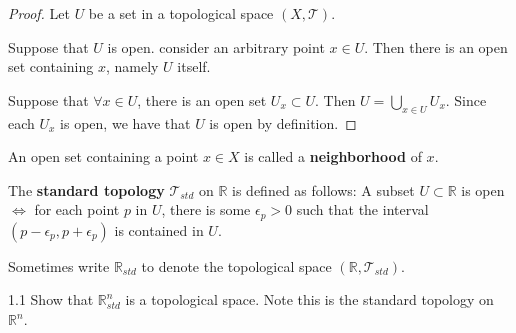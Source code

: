 \begin {proof}
Let $U$ be a set in a topological space $(X, \mathcal{T})$.

Suppose that $U$ is open.
consider an arbitrary point $x \in U$.
Then there is an open set containing $x$, namely $U$ itself.

Suppose that $\forall x \in U$, there is an open set $U_x \subset U$.
Then $U = \bigcup_{x \in U} U_x$.
Since each $U_x$ is open, we have that $U$ is open by definition.
\end {proof}

\begin {definition} [Neighborhood] \label {def:neighborhood}
An open set containing a point $x \in X$ is called a \textbf{neighborhood} of $x$.
\end {definition}

\begin {definition}  \label {def:standardtopology}
The \textbf{standard topology} $\mathcal{T}_{std}$ on $\mathbb{R}$ is defined as follows:
A subset $U \subset \mathbb{R}$ is open $\iff$ for each point $p$ in $U$, there is some $\epsilon_{p} > 0$
such that the interval $(p - \epsilon_{p}, p + \epsilon_{p})$ is contained in $U$.

Sometimes write $\mathbb{R}_{std}$ to denote the topological space $(\mathbb{R}, \mathcal{T}_{std})$.
\end {definition}

\begin {definition} [Euclidean Space] \label {def:euclidean}
A \textbf{Euclideon space} $\mathbb{R}^n$ is the set of n-tuples of real numbers.
The  between two points $x, y \in \mathbb{R}^n$ is defined as
$d(x, y) = \sqrt{\sum_{i=1}^n (x_i - y_i)^2}$

The Euclidean distance allows us to define the \textbf{open ball} in $\mathbb{R}^n}$ as follows:
Let $p \in \mathbb{R}^n$ be a point, and let $\epsilon > 0$.
Then the open ball $B(p, \epsilon) = \{x \mid d(p, x) < \epsilon \}$
\end {definition}

\begin {exercise} 1.1 \label {ex:1.1}
Show that $\mathbb{R}_{std}^n$ is a topological space.
Note this is the standard topology on $\mathbb{R}^n$.
\end {exercise}

